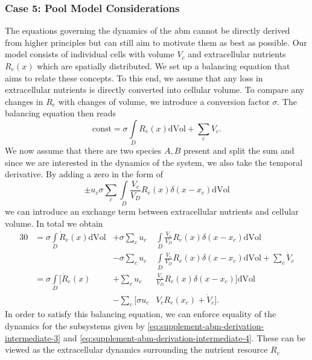 \subsubsection{Case 5: Pool Model Considerations}
\label{sec:supplement-abm-derivation}
The equations governing the dynamics of the \ac{abm} cannot be directly derived from
higher principles but can still aim to motivate them as best as possible.
Our model consists of individual cells with volume $V_c$ and extracellular nutrients
$R_e(x)$ which are spatially distributed.
We set up a balancing equation that aims to relate these concepts.
To this end, we assume that any loss in extracellular nutrients is directly converted
into cellular volume.
To compare any changes in $R_e$ with changes of volume, we introduce a conversion factor $\sigma$.
The balancing equation then reads
\begin{equation}
    \text{const} = \sigma \int\limits_D R_e(x)\text{dVol} + \sum\limits_c V_c.
\end{equation}
We now assume that there are two species $A,B$ present and split the sum and since we are
interested in the dynamics of the system, we also take the temporal derivative.
By adding a zero in the form of
\begin{equation}
    \pm u_c\sigma \sum\limits_c\int\limits_D\frac{V_c}{V_D}R_e(x)\delta(x-x_c)\text{dVol}
\end{equation}
we can introduce an exchange term between extracellular nutrients and cellular volume.
In total we obtain
\begin{alignat}{3}
    0 &= \sigma\int\limits_D\dot{R}_e(x)\text{dVol} &+ \sigma\sum\limits_c
    u_c&\int\limits_D\frac{V_c}{V_D}R_e(x)\delta(x-x_c)\text{dVol}\\
    &&- \sigma\sum\limits_c
    u_c&\int\limits_D\frac{V_c}{V_D}R_e(x)\delta(x-x_c)\text{dVol} + \sum\limits_c \dot{V}_c\\
    &= \sigma\int\limits_D\Big[\dot{R}_e(x) &+ \sum\limits_c
    u_c&\frac{V_c}{V_D}R_e(x)\delta(x-x_c)\Big]\text{dVol}
    \label{eq:supplement-abm-derivation-intermediate-3}\\
    &&- \sum\limits_c\Big[\sigma u_c&V_cR_e(x_c) + \dot{V}_c\Big].
    \label{eq:supplement-abm-derivation-intermediate-4}
\end{alignat}
In order to satisfy this balancing equation, we can enforce equality of the dynamics for
the subsystems given by \ref{eq:supplement-abm-derivation-intermediate-3} and
\ref{eq:supplement-abm-derivation-intermediate-4}.
These can be viewed as the extracellular dynamics surrounding the nutrient resource $R_e$
